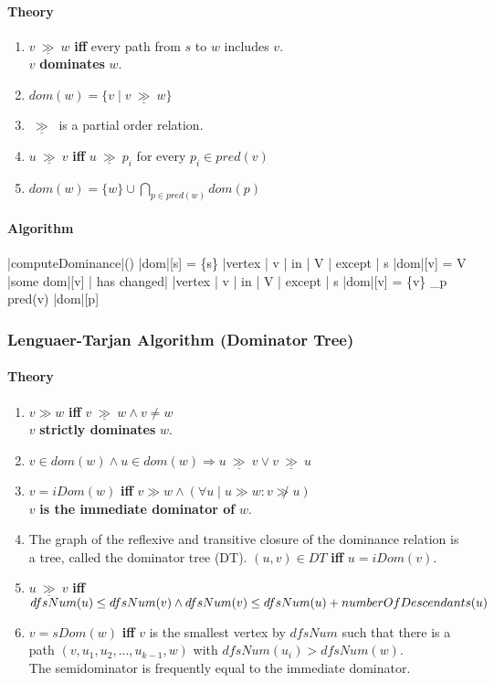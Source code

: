 \documentclass[a4paper,12pt, notitlepage]{article}
\newcommand{\gge}{\ \underline{\gg}\ }
\newcommand{\patodo}[3]{(\forall #1 \mid #2 : #3)}
\renewcommand{\iff}{\textbf{ iff }}
\begin{document}
\paragraph*{Theory}
\begin{enumerate}
\item $v \gge w $ \iff every path from $s$ to $w$ includes $v$. 
\\ $v$ \textbf{dominates} $w$.
\item $dom(w) = \{v \mid v \gge w\}$
\item $\gge$ is a partial order relation. 
\item $u \gge v$ \iff $u \gge p_i$ for every $p_i \in pred(v)$
\item $dom(w) = \{w\} \cup \displaystyle \bigcap_{p \in pred(w)} dom(p)$
\end{enumerate}
\vspace{-0.5cm}
\paragraph*{Algorithm}
\begin{program}
\PROC |computeDominance|() \BODY
    |dom|[s] = \{s\}
    \FOREACH |vertex | v | in | V | except | s \DO
        |dom|[v] = V \OD
    \WHILE |some dom|[v] | has changed| \DO
        \FOREACH |vertex | v | in | V | except | s \DO
            |dom|[v] = \{v\} \cup \displaystyle \bigcap_{p \in pred(v)} |dom|[p]
            \OD
    \OD
\end{program}
\subsubsection*{Lenguaer-Tarjan Algorithm (Dominator Tree)}
\paragraph*{Theory}
\begin{enumerate}
\item $v \gg w $ \iff $v \gge w \land v \not= w$
\\ $v$ \textbf{strictly dominates} $w$.
\item $v \in dom(w) \land u \in dom(w) \Rightarrow u \gge v \lor v \gge u$
\item $v = iDom(w)$ \iff $v \gg w \land \patodo{u}{u \gg w}{v \not\gg u}$
\\ $v$ \textbf{is the immediate dominator of} $w$.
\item The graph of the reflexive and transitive closure of the dominance
relation is a  tree, called the dominator tree (DT). $(u,v) \in DT$ 
\iff $u = iDom(v)$.
\item $u \gge v$ \iff $dfsNum(u) \leq dfsNum(v) \land \\ 
dfsNum(v) \leq dfsNum(u) + numberOfDescendants(u)$
\item $v = sDom(w)$ \iff $v$ is the smallest vertex by $dfsNum$ such that there
is a path $(v, u_1, u_2, ..., u_{k-1}, w)$ with $dfsNum(u_i) > dfsNum(w)$.
\\ The semidominator is frequently equal to the immediate dominator.
\end{enumerate}
\end{document}
